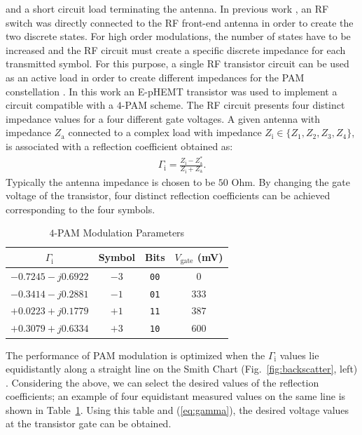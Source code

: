\documentclass[journal]{IEEEtran}
\begin{document}
and a short circuit load terminating the antenna.
%
In previous work \cite{daskalakis2017ambient}, an RF switch  was directly connected to the RF front-end  antenna in order to create the two discrete states.
%
For high order  modulations, the number of states have to be increased and the RF circuit  must create a specific  discrete impedance for each transmitted symbol.
%
For this purpose, a single RF  transistor circuit can be used as an active load in order to create different impedances for the PAM constellation  \cite{correia2017quadrature}.
%
In this work an E-pHEMT transistor was used to implement a circuit compatible with a $4$-PAM scheme. 
%
The RF circuit presents four distinct impedance values for a four different gate voltages. 
%
A given antenna with impedance $Z_\text{a}$ connected to a complex load with impedance $Z_\text{i}  \in \lbrace Z_\text{1} ,Z_\text{2} , Z_\text{3} ,Z_\text{4}  \rbrace$, is associated with a reflection coefficient obtained as:
%
\begin{align}
\Gamma_\text{i}=\frac{Z_\text{i}-Z^{*}_\text{a}}{Z_\text{i}+Z_\text{a}}.
\label{eq:gamma}
\end{align}
%
Typically the antenna impedance is  chosen to be  $50$ Ohm. By changing the gate voltage of the transistor, four distinct reflection coefficients can be achieved corresponding to the four symbols. 
%
\begin{table}[t]	
\renewcommand{\arraystretch}{1}
\centering
\caption{$4$-PAM Modulation Parameters}
\scalebox{1}
{
\begin{tabular}{c|c|c|c}
\hline
\hline
 $\Gamma_\text{i}$& Symbol & Bits & $V_\text{gate}$ (mV) \\
\hline
\hline
 $-0.7245 - j0.6922$ &$-3$ & \texttt{00} &$0$ \\
\hline
 $-0.3414 - j0.2881$&$-1$ & \texttt{01} &  $333$\\
\hline
$+0.0223 + j0.1779$&$+1$ &\texttt{11}  &  $387$
    \\
\hline
$+0.3079 + j0.6334$&$+3$ &  \texttt{10} & $600$ \\
\hline
\end{tabular}
}
\label{tab:gammas}
\end{table}
%
The performance of PAM modulation is optimized when the $\Gamma_\text{i}$ values lie equidistantly along a straight line on the Smith Chart (Fig.~\ref{fig:backscatter}, left) \cite{correia2017quadrature}.
%
Considering the above, we can select the desired values of the reflection coefficients; an example of four equidistant measured values on the same line is shown in  Table~\ref{tab:gammas}.
%
Using this table and (\ref{eq:gamma}), the desired voltage values at the transistor gate can be obtained. 
\end{document}
